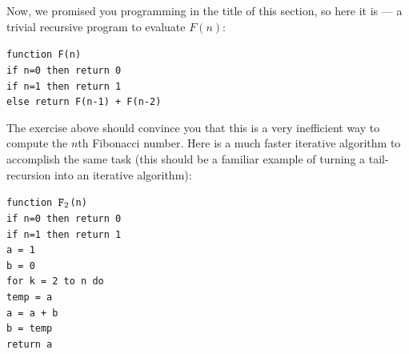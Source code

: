 \documentclass[11pt]{article}
\newcounter{thm}
\begin{document}
Now, we promised you programming in the title of this section, so here it is --- a trivial recursive program to evaluate $F(n)$:
\noindent
\begin{tabbing}
\quad\={\tt function F(n)}\\
\>\quad\=	{\tt if n=0 then return 0}\\	
\>\>		{\tt if n=1 then return 1}\\
\>\>		{\tt else return F(n-1) + F(n-2)}
\end{tabbing}			


The exercise above should convince you that this is a very inefficient way to compute the $n$th Fibonacci number. Here is a much faster iterative algorithm to accomplish the same task (this should be a familiar example of turning a tail-recursion into an iterative
algorithm):

\noindent
\begin{tabbing}
\quad\={\tt function $\hbox{\tt F}_2$(n)}\\
\>\quad\=	{\tt if n=0 then return 0}\\	
\>\>		{\tt if n=1 then return 1}\\
\>\>		{\tt a = 1}\\
\>\>		{\tt b = 0}\\
\>\>		{\tt for k = 2 to n do}\\
\>\>\quad\=	{\tt temp = a}\\
\>\>\>		{\tt a = a + b}\\
\>\>\>		{\tt b = temp}\\
\>\>		{\tt return a}
\end{tabbing}
			
\end{document}
